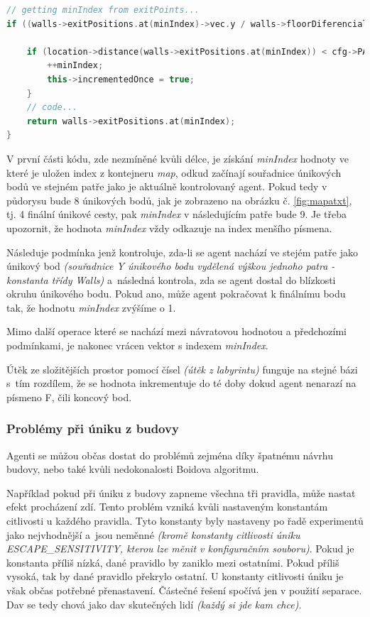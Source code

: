 \documentclass[czech,public,dept460,male,cpdeclaration]{diploma}
\begin{document}
\begin{lstlisting}[language=c++,label=src:mapSave,caption=Princip metody getArriveVector(...)]
// getting minIndex from exitPoints...
if ((walls->exitPositions.at(minIndex)->vec.y / walls->floorDiferencial) == this->floor) {
	
	if (location->distance(walls->exitPositions.at(minIndex)) < cfg->PATH_TO_FIND_RADIUS && !this->incrementedOnce) {
		++minIndex;
		this->incrementedOnce = true;
	}
	// code...
	return walls->exitPositions.at(minIndex);
}
\end{lstlisting}

V první části kódu, zde nezmíněné kvůli délce, je získání \textit{minIndex} hodnoty ve které je uložen index z kontejneru \textit{map}, odkud začínají souřadnice únikových bodů ve stejném patře jako je aktuálně kontrolovaný agent. Pokud tedy v půdorysu bude 8 únikových bodů, jak je zobrazeno na obrázku č. \ref{fig:mapatxt}, tj. 4 finální únikové cesty, pak \textit{minIndex} v následujícím patře bude 9. Je třeba upozornit, že hodnota \textit{minIndex} vždy odkazuje na index menšího písmena.

Následuje podmínka jenž kontroluje, zda-li se agent nachází ve stejém patře jako únikový bod \textit{(souřadnice Y únikového bodu vydělená výškou jednoho patra - konstanta třídy Walls)} a~následná kontrola, zda se agent dostal do blízkosti okruhu únikového bodu. Pokud ano, může agent pokračovat k finálnímu bodu tak, že hodnotu \textit{minIndex} zvýšíme o 1.

Mimo další operace které se nachází mezi návratovou hodnotou a předchozími podmínkami, je nakonec vrácen vektor s indexem \textit{minIndex}.

Útěk ze složitějších prostor pomocí čísel \textit{(útěk z labyrintu)} funguje na stejné bázi s~tím rozdílem, že se hodnota inkrementuje do té doby dokud agent nenarazí na písmeno F, čili koncový bod.

\subsubsection{Problémy při úniku z budovy}\label{sec:problemy-pri-uniku-z-budovy}

Agenti se můžou občas dostat do problémů zejména díky špatnému návrhu budovy, nebo také kvůli nedokonalosti Boidova algoritmu. 

Například pokud při úniku z budovy zapneme všechna tři pravidla, může nastat efekt procházení zdí. Tento problém vzniká kvůli nastaveným konstantám citlivosti u každého pravidla. Tyto konstanty byly nastaveny po řadě experimentů jako nejvhodnější a~jsou neměnné \textit{(kromě konstanty citlivosti úniku ESCAPE\_SENSITIVITY, kterou lze měnit v konfiguračním souboru)}. Pokud je konstanta příliš nízká, dané pravidlo by zaniklo mezi ostatními. Pokud příliš vysoká, tak by dané pravidlo překrylo ostatní. U konstanty citlivosti úniku je však občas potřebné přenastavení. Částečné řešení spočívá jen v použití separace. Dav se tedy chová jako dav skutečných lidí \textit{(každý si jde kam chce)}.
\end{document}
